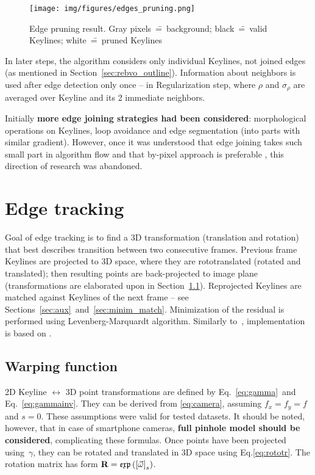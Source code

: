 \begin{figure}[ht]
	\centering\texttt{[image: img/figures/edges\_pruning.png]}
	\caption{ Edge pruning result. Gray pixels~\==~background; black~\==~valid Keylines; white~\==~pruned Keylines }
	\label{fig:pruning}
\end{figure}

In later steps, the algorithm considers only individual Keylines, not joined edges (as mentioned in Section~\ref{sec:rebvo_outline}). Information about neighbors is used after edge detection only once -- in Regularization step, where $\rho$ and $\sigma_{\rho}$
are averaged over Keyline and its 2 immediate neighbors.

Initially \textbf{more edge joining strategies had been considered}: morphological operations on Keylines, loop avoidance and edge segmentation (into parts with similar gradient). However, once it was understood that edge joining takes such small part in algorithm flow and that by-pixel approach is preferable \cite{harris}, this direction of research was abandoned.



\section{Edge tracking}

Goal of edge tracking is to find a 3D transformation (translation and rotation) that best describes transition between two consecutive frames. Previous frame Keylines are projected to 3D space, where they are rototranslated (rotated and translated); then resulting points are back-projected to image plane (transformations are elaborated upon in Section~\ref{sec:warp}). Reprojected Keylines are matched against Keylines of the next frame -- see Sections~\ref{sec:aux}~and~\ref{sec:minim_match}. Minimization of the residual is performed using Levenberg-Marquardt algorithm. Similarly to~\cite{jose2015realtime}, implementation is based on \cite{madsen2004methods}.

\subsection{Warping function}
\label{sec:warp}

2D Keyline $\longleftrightarrow$ 3D point transformations are defined by Eq.~\ref{eq:gamma}~and Eq.~\ref{eq:gammainv}. They can be derived from \ref{eq:camera}, assuming $f_x = f_y = f$ and $s = 0$. These assumptions were valid for tested datasets. It should be noted, however, that in case of smartphone cameras, \textbf{full pinhole model should be considered}, complicating these formulas. Once points have been projected using~$\gamma$, they can be rotated and translated in 3D space using Eq.\ref{eq:rototr}. The rotation matrix has form $\textbf{R} = \mathfrak{exp} \left ( \left[ \vec{\omega} \right ]_{s} \right )$.


